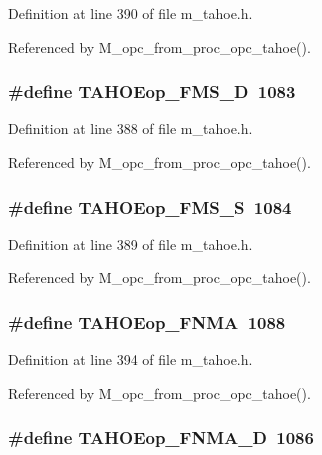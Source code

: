 Definition at line 390 of file m\_\-tahoe.h.

Referenced by M\_\-opc\_\-from\_\-proc\_\-opc\_\-tahoe().
\subsubsection{\setlength{\rightskip}{0pt plus 5cm}\#define TAHOEop\_\-FMS\_\-D~1083}\label{m__tahoe_8h_2bd05cf3c795233e2a8b7b657edaae9e}




Definition at line 388 of file m\_\-tahoe.h.

Referenced by M\_\-opc\_\-from\_\-proc\_\-opc\_\-tahoe().
\subsubsection{\setlength{\rightskip}{0pt plus 5cm}\#define TAHOEop\_\-FMS\_\-S~1084}\label{m__tahoe_8h_0d593b8ee5ca0d5f7ae44a50029c8215}




Definition at line 389 of file m\_\-tahoe.h.

Referenced by M\_\-opc\_\-from\_\-proc\_\-opc\_\-tahoe().
\subsubsection{\setlength{\rightskip}{0pt plus 5cm}\#define TAHOEop\_\-FNMA~1088}\label{m__tahoe_8h_0881df55ad2e9dd5d99b8ed264b3b61b}




Definition at line 394 of file m\_\-tahoe.h.

Referenced by M\_\-opc\_\-from\_\-proc\_\-opc\_\-tahoe().
\subsubsection{\setlength{\rightskip}{0pt plus 5cm}\#define TAHOEop\_\-FNMA\_\-D~1086}\label{m__tahoe_8h_1aa13057fe62dd2b3740d51a40f6bbd6}




